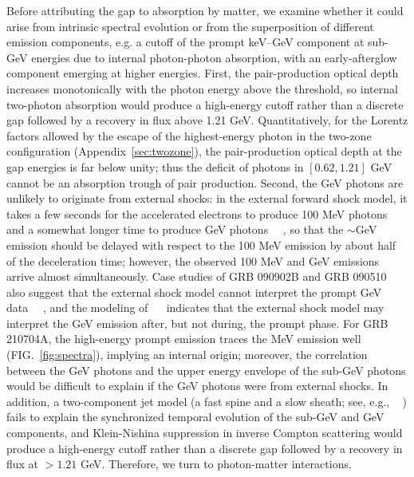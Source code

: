 \documentclass[prd,twocolumn,amsmath,amssymb,aps,linenumbers]{revtex4-2} %
\providecommand{\DIFaddtex}[1]{{\protect\color{blue} \sf #1}} %
\providecommand{\DIFaddend}{} %
\providecommand{\DIFadd}[1]{\texorpdfstring{\DIFaddtex{#1}}{#1}} %
\DeclareRobustCommand{\DIFaddend}{\DIFOaddend \let\includegraphics\DIFOincludegraphics} %
\begin{document}
\DIFadd{Before attributing the gap to absorption by matter, we examine whether it could arise from intrinsic spectral evolution or from the superposition of different emission components, e.g. a cutoff of the prompt keV--GeV component at sub-GeV energies due to internal photon-photon absorption, with an early-afterglow component emerging at higher energies.
First, the pair-production optical depth increases monotonically with the photon energy above the threshold, so internal two-photon absorption would produce a high-energy cutoff rather than a discrete gap followed by a recovery in flux above 1.21 GeV. Quantitatively, for the Lorentz factors allowed by the escape of the highest-energy photon in the two-zone configuration (Appendix~\ref{sec:twozone}), the pair-production optical depth at the gap energies is far below unity; thus the deficit of photons in $[0.62, 1.21]$ GeV cannot be an absorption trough of pair production.
Second, the GeV photons are unlikely to originate from external shocks: in the external forward shock model, it takes a few seconds for the accelerated electrons to produce 100 MeV photons and a somewhat longer time to produce GeV photons~\mbox{%
\citep{2011MNRAS.412..522B}}\hskip0pt%
, so that the $\sim$GeV emission should be delayed with respect to the 100 MeV emission by about half of the deceleration time; however, the observed 100 MeV and GeV emissions arrive almost simultaneously. Case studies of GRB 090902B and GRB 090510 also suggest that the external shock model cannot interpret the prompt GeV data~\mbox{%
\citep{2011ApJ...730....1L,2011ApJ...733...22H}}\hskip0pt%
, and the modeling of \mbox{%
\cite{2011MNRAS.415...77M} }\hskip0pt%
indicates that the external shock model may interpret the GeV emission after, but not during, the prompt phase. For GRB 210704A, the high-energy prompt emission traces the MeV emission well (FIG.~\ref{fig:spectra}), implying an internal origin; moreover, the correlation between the GeV photons and the upper energy envelope of the sub-GeV photons would be difficult to explain if the GeV photons were from external shocks.
In addition, a two-component jet model (a fast spine and a slow sheath; see, e.g., \mbox{%
\citealt{2025ApJ...995L...2A}}\hskip0pt%
) fails to explain the synchronized temporal evolution of the sub-GeV and GeV components, and Klein-Nishina suppression in inverse Compton scattering would produce a high-energy cutoff rather than a discrete gap followed by a recovery in flux at $>1.21$ GeV.
Therefore, we turn to photon-matter interactions.
}\DIFaddend 
\end{document}

